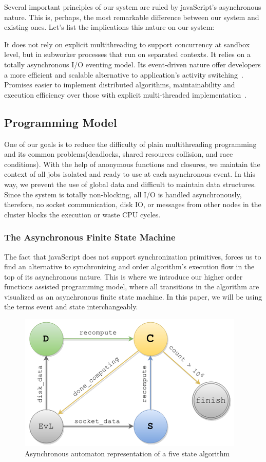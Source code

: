 \documentclass[10pt,reprint]{socc14}
\begin{document}
Several important principles of our system are ruled by javaScript’s asynchronous nature. This is, perhaps, the most remarkable difference between our system and existing ones. Let's list the implications this nature on our system:

It does not rely on explicit multithreading to support concurrency at sandbox level, but in subworker processes that run on separated contexts.
It relies on a totally asynchronous I/O eventing model.
Its event-driven nature offer developers a more efficient and scalable alternative to application’s activity switching~\cite{Tilkov2010}.
Promises easier to implement distributed algorithms, maintainability and execution efficiency over those with explicit multi-threaded implementation~\cite{Tilkov2010}. 

\subsection{Programming Model}
One of our goals is to reduce the difficulty of plain multithreading programming and its common problems(deadlocks, shared resources collision, and race conditions). With the help of anonymous functions and closures, we maintain the context of all jobs isolated and ready to use at each asynchronous event. In this way, we prevent the use of global data and difficult to maintain data structures. Since the system is totally non-blocking, all I/O is handled asynchronously, therefore, no socket communication, disk IO, or messages from other nodes in the cluster blocks the execution or waste CPU cycles.

\subsubsection{The Asynchronous Finite State Machine}
The fact that javaScript does not support synchronization primitives, forces us to find an alternative to synchronizing and order algorithm’s execution flow in the top of its asynchronous nature. This is where we introduce our higher order functions assisted programming model, where all transitions in the algorithm are visualized as an asynchronous finite state machine. In this paper, we will be using the terms event and state interchangeably.

\begin{figure}[h]	
	\centering
	\includegraphics[scale=0.55]{AsynchronousAutomaton}
	\caption{Asynchronous automaton representation of a five state algorithm}
	\label{fig:AsynchronousAutomaton}
\end{figure}
\end{document}

